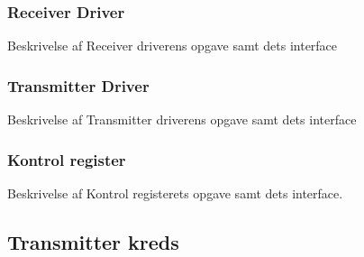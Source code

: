 \subsubsection{Receiver Driver}
Beskrivelse af Receiver driverens opgave samt dets interface
\subsubsection{Transmitter Driver}
Beskrivelse af Transmitter driverens opgave samt dets interface
\subsubsection{Kontrol register}
Beskrivelse af Kontrol registerets opgave samt dets interface.

\subsection{Transmitter kreds}

